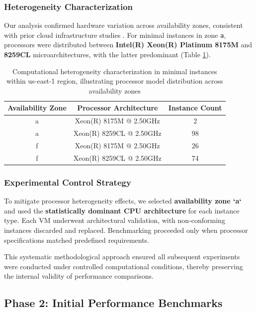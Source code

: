 \documentclass[conference]{IEEEtran}
\begin{document}
	\subsubsection{Heterogeneity Characterization}
	\label{met:heterogeneity-detection-item}
	Our analysis confirmed hardware variation across availability zones, consistent with prior cloud infrastructure studies \cite{pedro__lvarez_ed947120, zhonghong_ou_93958397, zhonghong_ou_2f9f325e, benjamin_farley_32066261}. For minimal instances in zone \texttt{a}, processors were distributed between \textbf{Intel(R) Xeon(R) Platinum 8175M} and \textbf{8259CL} microarchitectures, with the latter predominant (Table \ref{tab:processors}).
	
	\begin{table}[htbp]
		\centering
		\caption{Computational heterogeneity characterization in minimal instances within us-east-1 region, illustrating processor model distribution across availability zones}
		\label{tab:processors}
		\begin{tabular}{|c|c|c|}
			\hline
			Availability Zone & Processor Architecture & Instance Count \\ \hline
			a & Xeon(R) 8175M @ 2.50GHz & 2 \\ \hline
			a & Xeon(R) 8259CL @ 2.50GHz & 98 \\ \hline
			f & Xeon(R) 8175M @ 2.50GHz & 26 \\ \hline
			f & Xeon(R) 8259CL @ 2.50GHz & 74 \\ \hline
		\end{tabular}
	\end{table}
	
	\subsubsection{Experimental Control Strategy}
	To mitigate processor heterogeneity effects, we selected \textbf{availability zone `a`} and used the \textbf{statistically dominant CPU architecture} for each instance type. Each VM underwent architectural validation, with non-conforming instances discarded and replaced. Benchmarking proceeded only when processor specifications matched predefined requirements.
	
	This systematic methodological approach ensured all subsequent experiments were conducted under controlled computational conditions, thereby preserving the internal validity of performance comparisons.
	
	\subsection{Phase 2: Initial Performance Benchmarks}
	\label{execution-initial-performance-benchmarks}
	
\end{document}
